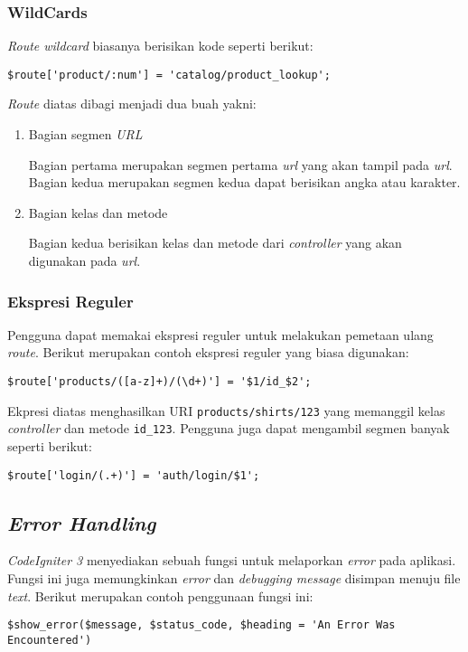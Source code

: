 \subsubsection{WildCards}

\textit{Route wildcard} biasanya berisikan kode seperti berikut:

\begin{center}
\verb|$route['product/:num'] = 'catalog/product_lookup';|
\end{center}

\textit{Route} diatas dibagi menjadi dua buah yakni:
\begin{enumerate}
\item Bagian segmen \textit{URL}

Bagian pertama merupakan segmen pertama \textit{url} yang akan tampil pada \textit{url}. Bagian kedua merupakan segmen kedua dapat berisikan angka atau karakter.

\item Bagian kelas dan metode

Bagian kedua berisikan kelas dan metode dari \textit{controller} yang akan digunakan pada \textit{url}.

\end{enumerate} 

\subsubsection{Ekspresi Reguler}

Pengguna dapat memakai ekspresi reguler untuk melakukan pemetaan ulang \textit{route}. Berikut merupakan contoh ekspresi reguler yang biasa digunakan:

\begin{center}
\verb|$route['products/([a-z]+)/(\d+)'] = '$1/id_$2';|
\end{center}

Ekpresi diatas menghasilkan URI \texttt{products/shirts/123} yang memanggil kelas \textit{controller} dan metode \texttt{id\_123}. Pengguna juga dapat mengambil segmen banyak seperti berikut:
\begin{center}
\verb|$route['login/(.+)'] = 'auth/login/$1';|
\end{center}

\subsection{\textit{Error Handling}}
\textit{CodeIgniter 3} menyediakan sebuah fungsi untuk melaporkan \textit{error} pada aplikasi. Fungsi ini juga memungkinkan \textit{error} dan \textit{debugging message} disimpan menuju file \textit{text}. Berikut merupakan contoh penggunaan fungsi ini:
\begin{center}
\verb|$show_error($message, $status_code, $heading = 'An Error Was Encountered')|
\end{center}

